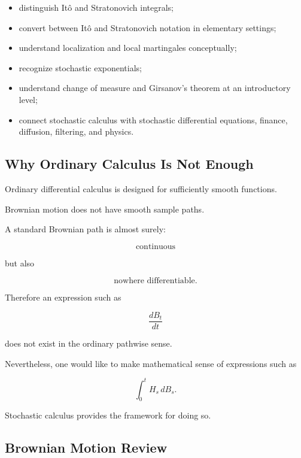 {\begin{itemize}
    \item distinguish It\^o and Stratonovich integrals;
    \item convert between It\^o and Stratonovich notation in elementary
          settings;
    \item understand localization and local martingales conceptually;
    \item recognize stochastic exponentials;
    \item understand change of measure and Girsanov's theorem at an
          introductory level;
    \item connect stochastic calculus with stochastic differential
          equations, finance, diffusion, filtering, and physics.
\end{itemize}
}

\subsection{Why Ordinary Calculus Is Not Enough}
\label{subsec:why-ordinary-calculus-not-enough}

Ordinary differential calculus is designed for sufficiently smooth
functions.

Brownian motion does not have smooth sample paths.

A standard Brownian path is almost surely:

\[
\boxed{
\text{continuous}
}
\]

but also

\[
\boxed{
\text{nowhere differentiable}.
}
\]

Therefore an expression such as

\[
\frac{dB_t}{dt}
\]

does not exist in the ordinary pathwise sense.

Nevertheless, one would like to make mathematical sense of expressions
such as

\[
\int_0^t H_s\,dB_s.
\]

Stochastic calculus provides the framework for doing so.

\subsection{Brownian Motion Review}
\label{subsec:brownian-review-stochastic-calculus}

